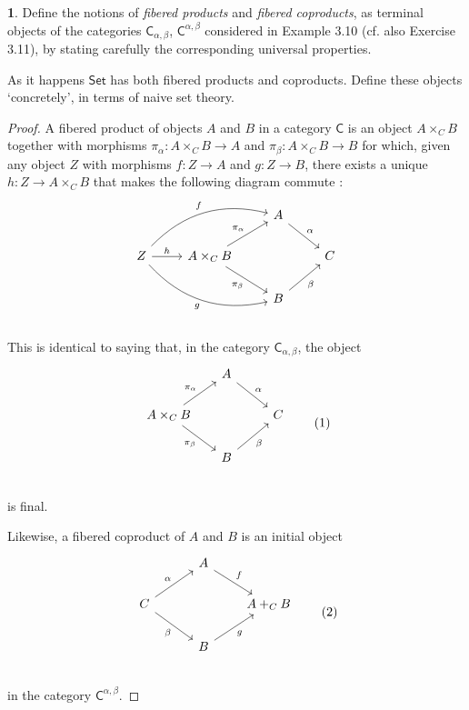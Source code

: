 \documentclass{article}
\theoremstyle{definition}
\newtheorem{ex}{}[section]
\begin{document}
\begin{ex}
	Define the notions of \textit{fibered products} and \textit{fibered coproducts}, as terminal objects of the categories $\mathsf{C}_{\alpha,\beta}$, $\mathsf{C}^{\alpha,\beta}$ considered in Example 3.10 (cf. also Exercise 3.11), by stating carefully the corresponding universal properties.

	As it happens $\mathsf{Set}$ has both fibered products and coproducts.
	Define these objects `concretely', in terms of naive set theory.
\end{ex}
\begin{proof}
	A fibered product of objects $A$ and $B$ in a category $\mathsf{C}$ is an object $A \times_C B$ together with morphisms $\pi_\alpha : A \times_C B \to A$ and $\pi_\beta : A \times_C B \to B$ for which, given any object $Z$ with morphisms $f : Z \to A$ and $g : Z \to B$, there exists a unique $h : Z \to A \times_C B$ that makes the following diagram commute : \begin{equation*}
		\begin{tikzcd}
			& & A \arrow[dr, "\alpha"] \\
			Z \arrow[urr, bend left, "f"] \arrow[r, "h"] \arrow[drr, bend right, "g"'] & A \times_C B \arrow[ur, "\pi_\alpha"] \arrow[dr, "\pi_\beta"'] & & C \\
			& & B \arrow[ur, "\beta"'] \\
		\end{tikzcd}
	\end{equation*}
	This is identical to saying that, in the category $\mathsf{C}_{\alpha,\beta}$, the object \begin{equation*}
		\begin{tikzcd}
			&[-0.3cm] A \arrow[dr, "\alpha"] \\
			A \times_C B \arrow[ur, "\pi_\alpha"] \arrow[dr, "\pi_\beta"'] & & C \\
			& B \arrow[ur, "\beta"'] \\
		\end{tikzcd} \tag{1}
	\end{equation*}
	is final.

	Likewise, a fibered coproduct of $A$ and $B$ is an initial object \begin{equation*}
		\begin{tikzcd}[column sep=3em]
			& A \arrow[dr, "f"] \\
			C \arrow[ur, "\alpha"] \arrow[dr, "\beta"'] & &[-0.3cm] A +_C B\\
			& B \arrow[ur, "g"'] \\
		\end{tikzcd} \tag{2}
	\end{equation*}
	in the category $\mathsf{C}^{\alpha,\beta}$.


\end{proof}
\end{document}
